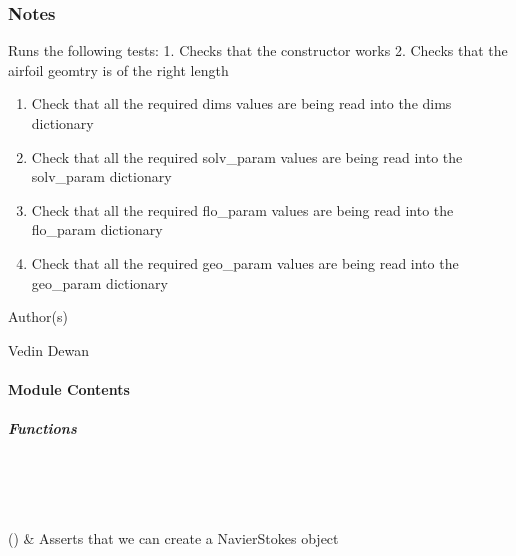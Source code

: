 \documentclass[letterpaper,10pt,english]{sphinxmanual}
\begin{document}
\subsubsection*{Notes}

\sphinxAtStartPar
Runs the following tests:
1. Checks that the constructor works
2. Checks that the airfoil geomtry is of the right length
\begin{enumerate}
%
\setcounter{enumi}{2}
\item {} 
\sphinxAtStartPar
Check that all the required dims values are being read into the dims dictionary

\item {} 
\sphinxAtStartPar
Check that all the required solv\_param values are being read into the solv\_param dictionary

\item {} 
\sphinxAtStartPar
Check that all the required flo\_param values are being read into the flo\_param dictionary

\item {} 
\sphinxAtStartPar
Check that all the required geo\_param values are being read into the geo\_param dictionary

\end{enumerate}

\sphinxAtStartPar
Author(s)

\sphinxAtStartPar
Vedin Dewan


\paragraph{Module Contents}
\label{\detokenize{autoapi/tests/test_NavierStokes/index:module-contents}}

\subparagraph{Functions}
\label{\detokenize{autoapi/tests/test_NavierStokes/index:functions}}

\begin{savenotes}\sphinxatlongtablestart\begin{longtable}[c]{}
\hline

\endfirsthead

%
{}\\
\hline

\endhead

\hline
{}\\
\endfoot

\endlastfoot

\sphinxAtStartPar
{\hyperref[\detokenize{autoapi/tests/test_NavierStokes/index:tests.test_NavierStokes.test_constructor}]{}}()
&
\sphinxAtStartPar
Asserts that we can create a NavierStokes object
\\
\hline
\end{longtable}\sphinxatlongtableend\end{savenotes}
\end{document}

